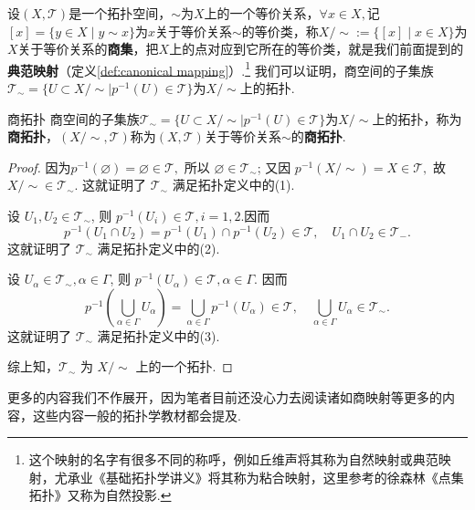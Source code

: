 \documentclass[12pt, a4paper,newtx]{ctexart}
\begin{document}
设$(X,\mathscr{T})$是一个拓扑空间，$\sim $为$X$上的一个等价关系，$\forall x\in X,$记$[x]=\{y\in X\mid y\sim x\}$为$x$关于等价关系$\sim$的等价类，称$X/\sim:=\{[x]\mid x\in X\}$为$X$关于等价关系的\textbf{商集}，把$X$上的点对应到它所在的等价类，就是我们前面提到的\textbf{典范映射}（定义\ref{def:canonical mapping}）.\footnote{这个映射的名字有很多不同的称呼，例如丘维声\cite{3}将其称为自然映射或典范映射，尤承业《基础拓扑学讲义》将其称为粘合映射，这里参考的徐森林《点集拓扑》\cite{4}又称为自然投影. } 我们可以证明，商空间的子集族$\mathscr{T}_{\sim}=\{U\subset X/\sim\mid p^{-1}(U)\in\mathscr{T}\}$为$X/\sim$上的拓扑. 
\begin{theorem}{商拓扑}{}
	商空间的子集族$\mathscr{T}_{\sim}=\{U\subset X/\sim\mid p^{-1}(U)\in\mathscr{T}\}$为$X/\sim$上的拓扑，称为\textbf{商拓扑}，$(X/\sim,\mathscr{T})$称为$(X,\mathscr{T})$关于等价关系$\sim$的\textbf{商拓扑}.
\end{theorem}
\begin{proof}
	因为$p^{-1}(\varnothing) = \varnothing \in \mathscr{T},$
	所以 $\varnothing\in \mathscr{T}_{\sim}$; 又因
	$p^{-1}(X/\sim) = X \in \mathscr{T},$
	故 $X/\sim \in \mathscr{T}_{\sim}.$ 这就证明了 $\mathscr{T}_{\sim}$ 满足拓扑定义中的(1).
	
	设 $U_1, U_2 \in \mathscr{T}_{\sim}$, 则 $p^{-1}(U_i) \in \mathscr{T}, i = 1, 2. $因而
	\[
	p^{-1}(U_1 \cap U_2) = p^{-1}(U_1) \cap p^{-1}(U_2) \in \mathscr{T},\quad U_1 \cap U_2 \in \mathscr{T}_{-}.
	\]
	这就证明了 $\mathscr{T}_{\sim}$ 满足拓扑定义中的(2).
	
	设 $U_\alpha \in \mathscr{T}_{\sim}, \alpha \in \Gamma$, 则 $p^{-1}(U_\alpha) \in \mathscr{T}, \alpha \in \Gamma.$ 因而
	\[
	p^{-1}(\bigcup_{\alpha \in \Gamma} U_\alpha) = \bigcup_{\alpha \in \Gamma} p^{-1}(U_\alpha) \in \mathscr{T},\quad \bigcup_{\alpha \in \Gamma} U_\alpha \in \mathscr{T}_{\sim}.
	\]
	这就证明了 $\mathscr{T}_{\sim}$ 满足拓扑定义中的(3).
	
	综上知，$\mathscr{T}_{\sim}$ 为 $X/\sim$ 上的一个拓扑. 
\end{proof}
更多的内容我们不作展开，因为笔者目前还没心力去阅读诸如商映射等更多的内容，这些内容一般的拓扑学教材都会提及. 
\end{document}

